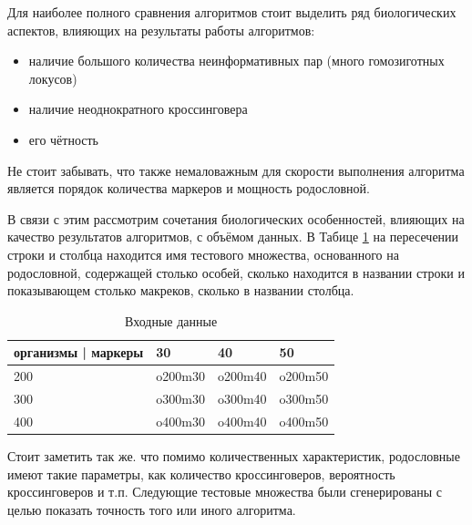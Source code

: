 \documentclass{matmex-diploma-custom}
\begin{document}
Для наиболее полного сравнения алгоритмов стоит выделить ряд
биологических аспектов, влияющих на результаты работы алгоритмов:
\begin{itemize}
\item наличие большого количества неинформативных пар (много
  гомозиготных локусов)
\item наличие неоднократного кроссинговера
\item его чётность
\end{itemize}

Не стоит забывать, что также немаловажным для скорости выполнения
алгоритма является порядок количества маркеров и мощность родословной.

В связи с этим рассмотрим сочетания биологических особенностей,
влияющих на качество результатов алгоритмов, с объёмом данных.  В
Табице \ref{tab:data} на пересечении строки и столбца находится имя
тестового множества, основанного на родословной, содержащей столько
особей, сколько находится в названии строки и показывающем столько
макреков, сколько в названии столбца.

\begin{table}[h]
  \centering
\begin{tabular}{llll}
\hline
организмы |  маркеры & 30 & 40 & 50 \\
\hline
200 & o200m30 & o200m40 & o200m50 \\
300 & o300m30 & o300m40 & o300m50 \\
400 & o400m30 & o400m40 & o400m50 \\
\hline
\end{tabular}
  \caption{Входные данные}
  \label{tab:data}
\end{table}

Стоит заметить так же. что помимо количественных характеристик,
родословные имеют такие параметры, как количество кроссинговеров,
вероятность кроссинговеров и т.п. Следующие тестовые множества были
сгенерированы с целью показать точность того или иного алгоритма.
\end{document}
